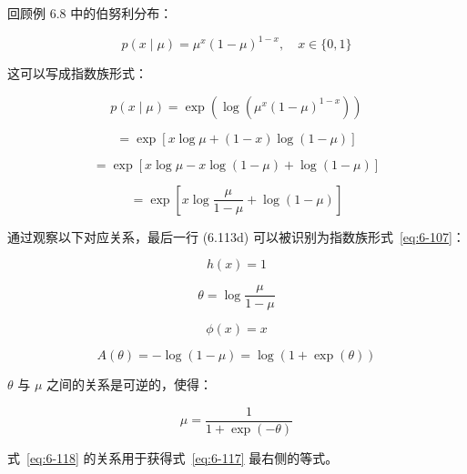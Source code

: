 \begin{notebox}
回顾例 6.8 中的伯努利分布：

\begin{equation}
p(x \mid \mu) = \mu^x (1 - \mu)^{1-x}, \quad x \in \{0, 1\}
\tag{6.112}\label{eq:6-112}
\end{equation}

这可以写成指数族形式：

\begin{equation}
p(x \mid \mu) = \exp \left( \log \left( \mu^x (1 - \mu)^{1-x} \right) \right)
\tag{6.113a}\label{eq:6-113a}
\end{equation}

\begin{equation}
= \exp [x \log \mu + (1 - x) \log(1 - \mu)]
\tag{6.113b}\label{eq:6-113b}
\end{equation}

\begin{equation}
= \exp [x \log \mu - x \log(1 - \mu) + \log(1 - \mu)]
\tag{6.113c}\label{eq:6-113c}
\end{equation}

\begin{equation}
= \exp \left[ x \log \frac{\mu}{1 - \mu} + \log(1 - \mu) \right]
\tag{6.113d}\label{eq:6-113d}
\end{equation}

通过观察以下对应关系，最后一行 (6.113d) 可以被识别为指数族形式~\eqref{eq:6-107}：

\begin{equation}
h(x) = 1
\tag{6.114}\label{eq:6-114}
\end{equation}

\begin{equation}
\theta = \log \frac{\mu}{1 - \mu}
\tag{6.115}\label{eq:6-115}
\end{equation}

\begin{equation}
\phi(x) = x
\tag{6.116}\label{eq:6-116}
\end{equation}

\begin{equation}
A(\theta) = -\log(1 - \mu) = \log(1 + \exp(\theta))
\tag{6.117}\label{eq:6-117}
\end{equation}

$ \theta $ 与 $ \mu $ 之间的关系是可逆的，使得：

\begin{equation}
\mu = \frac{1}{1 + \exp(-\theta)}
\tag{6.118}\label{eq:6-118}
\end{equation}

式~\eqref{eq:6-118} 的关系用于获得式~\eqref{eq:6-117} 最右侧的等式。
\end{notebox}

